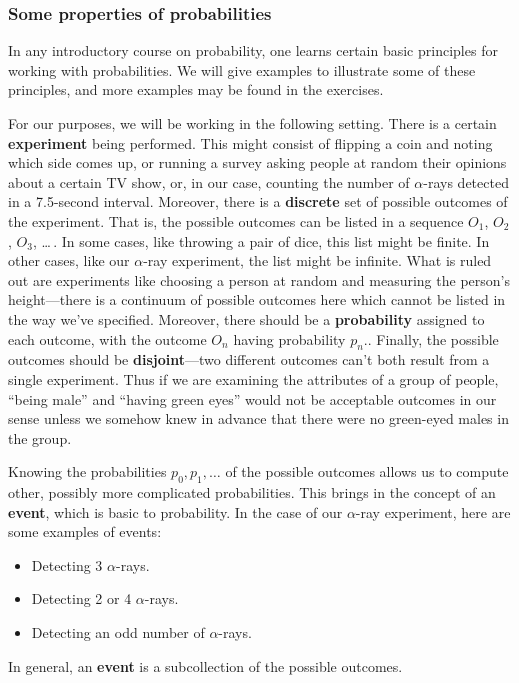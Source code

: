 {{{{\subsubsection{Some properties of probabilities}

        In any introductory course on probability, one learns certain basic principles for working with probabilities.  We will give examples to illustrate some of these principles, and more examples may be found in the exercises.  

For our purposes, we will be working in the following setting.  There is a certain {\bf experiment} being performed.  This might consist of flipping
 a coin and noting which side comes up, or running a survey asking people at random their opinions about a certain TV show, or, in our case, counting the number of $\alpha$-rays detected in a 7.5-second interval.  Moreover, there is a {\bf discrete} set of possible outcomes of the experiment.  That is, the possible outcomes can be listed in a sequence $O_1$, $O_2$, $O_3$, \ldots\,.  In some cases, like throwing a pair of dice, this list might be finite.  In other cases, like our $\alpha$-ray experiment, the list might be infinite.  What is ruled out are experiments like choosing a person at random and measuring the person's height---there is a continuum of possible outcomes here which cannot be listed in the way we've specified.  Moreover, there should be a {\bf probability} assigned to each outcome, with the outcome $O_n$ having probability $p_n$..  Finally, the possible outcomes should be {\bf disjoint}---two different outcomes can't both result from a single experiment.  Thus if we are examining the attributes of a group of people, ``being male'' and ``having green eyes'' would not be acceptable outcomes in our sense unless we somehow knew in advance that there were no green-eyed males in the group.

Knowing the probabilities $p_0,p_1,\ldots$ of the possible outcomes allows us to compute other, possibly more complicated probabilities.  This brings in the concept of an {\bf event}, which is basic to probability.  In the case of our $\alpha$-ray experiment, here are some examples of events:
\begin{itemize}
\item Detecting 3 $\alpha$-rays.
\item Detecting 2 or 4 $\alpha$-rays.
\item Detecting an odd number of $\alpha$-rays.
\end{itemize}
In general, an {\bf event} is a subcollection of the possible outcomes.
\begin{quote}  


\end{quote}}}}}
